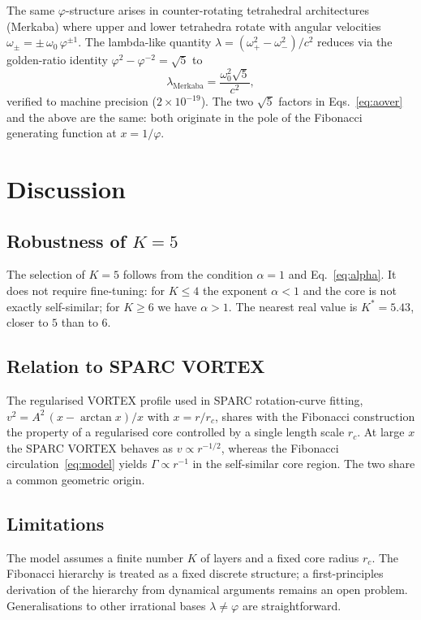 \documentclass[twocolumn,aps,prfluids]{revtex4-2}
\newcommand{\phig}{\varphi}
\newcommand{\Gam}{\Gamma}
\begin{document}
The same $\phig$-structure arises in counter-rotating tetrahedral
architectures (Merkaba) where upper and lower tetrahedra rotate with
angular velocities $\omega_{\pm} = \pm\,\omega_0\,\phig^{\pm 1}$. The
lambda-like quantity $\lambda = (\omega_+^2 - \omega_-^2)/c^2$ reduces
via the golden-ratio identity $\phig^2 - \phig^{-2} = \sqrt{5}$ to
\begin{equation}
\boxed{\lambda_{\text{Merkaba}} = \frac{\omega_0^2\sqrt{5}}{c^2},}
\end{equation}
verified to machine precision ($2\times10^{-19}$). The two
$\sqrt{5}$ factors in Eqs.~\eqref{eq:aover} and the above are the same:
both originate in the pole of the Fibonacci generating function at
$x = 1/\phig$.

\section{Discussion}
\label{sec:disc}

\subsection{Robustness of $K=5$}

The selection of $K=5$ follows from the condition $\alpha=1$ and
Eq.~\eqref{eq:alpha}. It does not require fine-tuning: for $K \leq 4$
the exponent $\alpha < 1$ and the core is not exactly self-similar;
for $K \geq 6$ we have $\alpha > 1$. The nearest real value is
$K^*=5.43$, closer to $5$ than to $6$.

\subsection{Relation to SPARC VORTEX}

The regularised VORTEX profile used in SPARC rotation-curve fitting,
$v^2 = A^2\,(x - \arctan x)/x$ with $x = r/r_c$, shares with the
Fibonacci construction the property of a regularised core controlled
by a single length scale $r_c$. At large $x$ the SPARC VORTEX behaves
as $v \propto r^{-1/2}$, whereas the Fibonacci circulation~\eqref{eq:model}
yields $\Gam \propto r^{-1}$ in the self-similar core region. The two
share a common geometric origin.

\subsection{Limitations}

The model assumes a finite number $K$ of layers and a fixed core
radius $r_c$. The Fibonacci hierarchy is treated as a fixed discrete
structure; a first-principles derivation of the hierarchy from
dynamical arguments remains an open problem. Generalisations to
other irrational bases $\lambda \neq \phig$ are straightforward.
\end{document}

